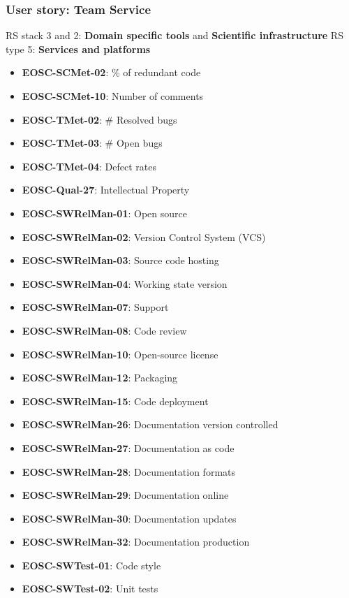 \subsubsection{User story: Team Service}

RS stack 3 and 2: \textbf{Domain specific tools} and \textbf{Scientific infrastructure} \newline
RS type 5: \textbf{Services and platforms}

\begin{itemize}
    \item \textbf{EOSC-SCMet-02}: \% of redundant code
    \item \textbf{EOSC-SCMet-10}: Number of comments
    \item \textbf{EOSC-TMet-02}: \# Resolved bugs
    \item \textbf{EOSC-TMet-03}: \# Open bugs
    \item \textbf{EOSC-TMet-04}: Defect rates
    \item \textbf{EOSC-Qual-27}: Intellectual Property
    \item \textbf{EOSC-SWRelMan-01}: Open source
    \item \textbf{EOSC-SWRelMan-02}: Version Control System (VCS)
    \item \textbf{EOSC-SWRelMan-03}: Source code hosting
    \item \textbf{EOSC-SWRelMan-04}: Working state version
    \item \textbf{EOSC-SWRelMan-07}: Support
    \item \textbf{EOSC-SWRelMan-08}: Code review
    \item \textbf{EOSC-SWRelMan-10}: Open-source license
    \item \textbf{EOSC-SWRelMan-12}: Packaging
    \item \textbf{EOSC-SWRelMan-15}: Code deployment
    \item \textbf{EOSC-SWRelMan-26}: Documentation version controlled
    \item \textbf{EOSC-SWRelMan-27}: Documentation as code
    \item \textbf{EOSC-SWRelMan-28}: Documentation formats
    \item \textbf{EOSC-SWRelMan-29}: Documentation online
    \item \textbf{EOSC-SWRelMan-30}: Documentation updates
    \item \textbf{EOSC-SWRelMan-32}: Documentation production
    \item \textbf{EOSC-SWTest-01}: Code style
    \item \textbf{EOSC-SWTest-02}: Unit tests

\end{itemize}

